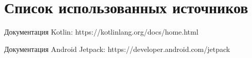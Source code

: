 \chapter{Список использованных источников}

Документация Kotlin: https://kotlinlang.org/docs/home.html

Документация Android Jetpack: https://developer.android.com/jetpack

\endinput